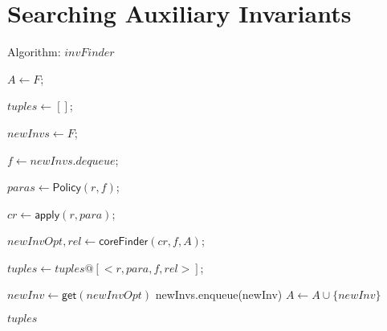 \documentclass[conference]{IEEEtran}
\begin{document}
{\section{  Searching Auxiliary Invariants}
\vspace{-10pt}

\SetAlFnt{\small}


\begin{algorithm}\label{alg:invFinder}

\caption{Algorithm: $invFinder$}\label{alg:invfinder}



{
    $A\leftarrow F$;

    $tuples \leftarrow []$;

    $newInvs \leftarrow F$;

    {
   $ f \leftarrow newInvs.dequeue$;

   { $paras \leftarrow \mathsf{Policy}(r,f)$;

     {$cr \leftarrow \mathsf{apply}(r,para)$;

       $newInvOpt,rel \leftarrow \mathsf{coreFinder}(cr,  f, A)$;

        $tuples \leftarrow tuples @[<r, para, f, rel>]$;

        {$newInv \leftarrow \mathsf{get}(newInvOpt)$\;
         newInvs.enqueue(newInv)\;
        $A \leftarrow A \cup \{newInv\}$\;
        }

     }
   }
  }
\Return $tuples$\;
}



\end{algorithm}}
\end{document}

